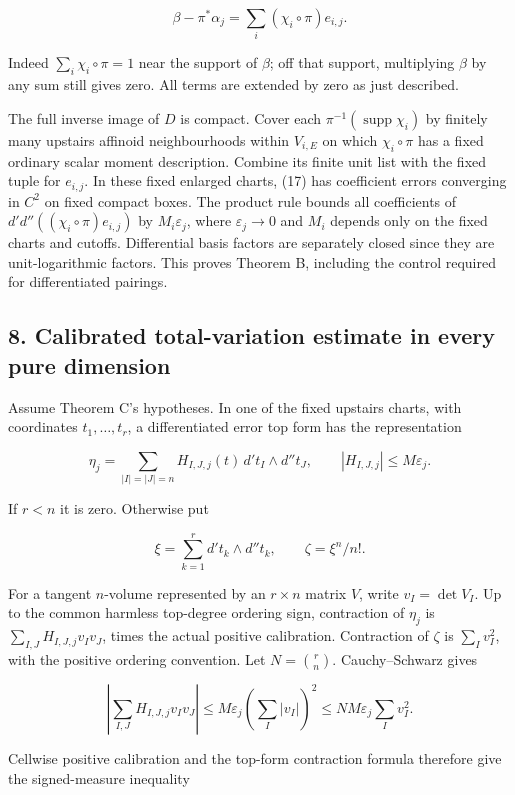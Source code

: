 \documentclass[
  11pt,
]{article}
\begin{document}
\[\beta-\pi^*\alpha_j=\sum_i(\chi_i\circ\pi)e_{i,j}. \tag{17}\]

Indeed \(\sum_i\chi_i\circ\pi=1\) near the support of \(\beta\); off
that support, multiplying \(\beta\) by any sum still gives zero. All
terms are extended by zero as just described.

The full inverse image of \(D\) is compact. Cover each
\(\pi^{-1}(\operatorname{supp}\chi_i)\) by finitely many upstairs
affinoid neighbourhoods within \(V_{i,E}\) on which \(\chi_i\circ\pi\)
has a fixed ordinary scalar moment description. Combine its finite unit
list with the fixed tuple for \(e_{i,j}\). In these fixed enlarged
charts, (17) has coefficient errors converging in \(C^2\) on fixed
compact boxes. The product rule bounds all coefficients of
\(d'd''((\chi_i\circ\pi)e_{i,j})\) by \(M_i\varepsilon_j\), where
\(\varepsilon_j\to0\) and \(M_i\) depends only on the fixed charts and
cutoffs. Differential basis factors are separately closed since they are
unit-logarithmic factors. This proves Theorem B, including the control
required for differentiated pairings.

\subsection{8. Calibrated total-variation estimate in every pure
dimension}\label{calibrated-total-variation-estimate-in-every-pure-dimension}

Assume Theorem C's hypotheses. In one of the fixed upstairs charts, with
coordinates \(t_1,\ldots,t_r\), a differentiated error top form has the
representation

\[\eta_j=\sum_{|I|=|J|=n}H_{I,J,j}(t)\,d't_I\wedge d''t_J,\qquad |H_{I,J,j}|\leq M\varepsilon_j.\]

If \(r<n\) it is zero. Otherwise put

\[\xi=\sum_{k=1}^r d't_k\wedge d''t_k,\qquad\zeta=\xi^n/n!.\]

For a tangent \(n\)-volume represented by an \(r\times n\) matrix \(V\),
write \(v_I=\det V_I\). Up to the common harmless top-degree ordering
sign, contraction of \(\eta_j\) is \(\sum_{I,J}H_{I,J,j}v_Iv_J\), times
the actual positive calibration. Contraction of \(\zeta\) is
\(\sum_I v_I^2\), with the positive ordering convention. Let
\(N=\binom rn\). Cauchy--Schwarz gives

\[\left|\sum_{I,J}H_{I,J,j}v_Iv_J\right|
\leq M\varepsilon_j\left(\sum_I|v_I|\right)^2
\leq NM\varepsilon_j\sum_Iv_I^2.\]

Cellwise positive calibration and the top-form contraction formula
therefore give the signed-measure inequality
\end{document}
